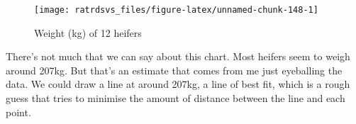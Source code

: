 \documentclass[
]{book}
\newenvironment{Shaded}{\begin{snugshade}}{\end{snugshade}}
\newcommand{\DataTypeTok}[1]{\textcolor[rgb]{0.13,0.29,0.53}{#1}}
\newcommand{\DecValTok}[1]{\textcolor[rgb]{0.00,0.00,0.81}{#1}}
\newcommand{\KeywordTok}[1]{\textcolor[rgb]{0.13,0.29,0.53}{\textbf{#1}}}
\newcommand{\NormalTok}[1]{#1}
\newcommand{\OperatorTok}[1]{\textcolor[rgb]{0.81,0.36,0.00}{\textbf{#1}}}
\newcommand{\StringTok}[1]{\textcolor[rgb]{0.31,0.60,0.02}{#1}}
\begin{document}
\begin{Shaded}
\end{Shaded}

\begin{figure}

{\centering \texttt{[image: ratrdsvs\_files/figure-latex/unnamed-chunk-148-1]} 

}

\caption{Weight (kg) of 12 heifers}\label{fig:unnamed-chunk-148}
\end{figure}

There's not much that we can say about this chart. Most heifers seem to weigh around 207kg. But that's an estimate that comes from me just eyeballing the data. We could draw a line at around 207kg, a line of best fit, which is a rough guess that tries to minimise the amount of distance between the line and each point.
\end{document}
